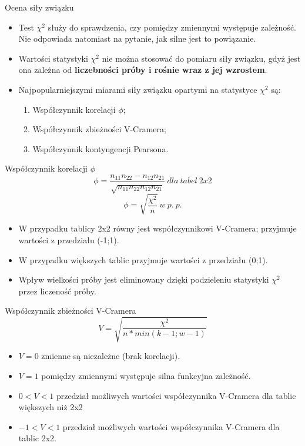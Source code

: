 \documentclass{beamer}
\begin{document}
\begin{frame}{Ocena siły związku}
  \begin{itemize}
  \item Test $\chi^2$ służy do sprawdzenia, czy pomiędzy zmiennymi występuje zależność. Nie odpowiada natomiast na pytanie, jak silne jest to powiązanie.
  \item Wartości statystyki $\chi^2$ nie można stosować do pomiaru siły związku, gdyż jest ona zależna od \textbf{liczebności próby i rośnie wraz z jej wzrostem}.
  \item Najpopularniejszymi miarami siły związku opartymi na statystyce $\chi^2$ są:
    \begin{enumerate}
    \item Współczynnik korelacji $\phi$;
    \item Współczynnik zbieżności V-Cramera;
    \item Współczynnik kontyngencji Pearsona.
    \end{enumerate}
  \end{itemize}
\end{frame}

\begin{frame}{Współczynnik korelacji $\phi$}
    $$\phi = \frac{n_{11}n_{22} - n_{12}n_{21}}{\sqrt{n_{11}n_{22}n_{12}n_{21}}}\ dla\ tabel\ 2x2$$
  $$\phi = \sqrt{\frac{\chi^2}{n}}\ w\ p.\ p. $$
  \begin{itemize}
  \item W przypadku tablicy 2x2 równy jest współczynnikowi V-Cramera; przyjmuje wartości z przedziału (-1;1).
  \item W przypadku większych tablic przyjmuje wartości z przedziału (0;1).
  \item Wpływ wielkości próby jest eliminowany dzięki podzieleniu statystyki $\chi^2$ przez liczeność próby.
  \end{itemize}
\end{frame}

\begin{frame}{Współczynnik zbieżności V-Cramera}
  $$V = \sqrt{\frac{\chi^2}{n*min(k-1;w-1)}}$$
  \begin{itemize}
  \item $V = 0$ zmienne są niezależne (brak korelacji).
  \item $V = 1$ pomiędzy zmiennymi występuje silna funkcyjna zależność.
  \item $0 < V < 1$ przedział możliwych wartości współczynnika V-Cramera dla tablic większych niż 2x2
  \item $-1 < V < 1$ przedział możliwych wartości współczynnika V-Cramera dla tablic 2x2.
  \end{itemize}
\end{frame}
\end{document}
